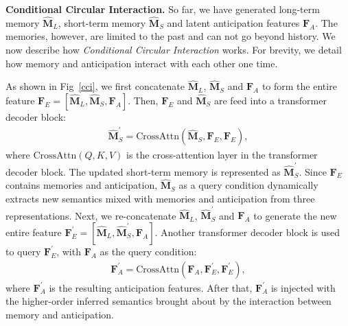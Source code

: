 \textbf{Conditional Circular Interaction.}
So far, we have generated long-term memory $\mathbf{\widehat{M}}_L$, short-term memory $\mathbf{\widehat{M}}_S$ and latent anticipation features $\mathbf{F}_A$. The memories, however, are limited to the past and can not go beyond history. 
We now describe how \emph{Conditional Circular Interaction} works.
For brevity, we detail how memory and anticipation interact with each other one time.


As shown in Fig~\ref{cci}, we first concatenate $\mathbf{\widehat{M}}_L$, $\mathbf{\widehat{M}}_S$ and $\mathbf{F}_A$ to form the entire feature $\mathbf{F}_E = [\mathbf{\widehat{M}}_L, \mathbf{\widehat{M}}_S, \mathbf{F}_A]$. 
Then, $\mathbf{F}_E$ and $\mathbf{\widehat{M}}_S$ are feed into a transformer decoder block:
\begin{equation}
    \begin{aligned}
        \mathbf{\widehat{M}}_S^{\prime} = \text{CrossAttn}(\mathbf{\widehat{M}}_S,\mathbf{F}_E,\mathbf{F}_E),
    \end{aligned}
\end{equation}
where $\text{CrossAttn}(Q,K,V)$ is the cross-attention layer in the transformer decoder block. The updated short-term memory is represented as $\mathbf{\widehat{M}}_S^{\prime}$. Since $\mathbf{F}_E$ contains memories and anticipation, $\mathbf{\widehat{M}}_S$ as a query condition dynamically extracts new semantics mixed with memories and anticipation from three representations.  Next, we re-concatenate $\mathbf{\widehat{M}}_L$, $\mathbf{\widehat{M}}_S^{\prime}$ and $\mathbf{F}_A$ to generate the new entire feature $\mathbf{F}_E^{\prime} = [\mathbf{\widehat{M}}_L, \mathbf{\widehat{M}}_S^{\prime}, \mathbf{F}_A]$. Another transformer decoder block is used to query $\mathbf{F}_E^{\prime}$, with $\mathbf{F}_A$ as the query condition:
\begin{equation}
    \begin{aligned}
        \mathbf{\mathbf{F}}_A^{\prime} = \text{CrossAttn}(\mathbf{F}_A,\mathbf{F}_E^{\prime},\mathbf{F}_E^{\prime}),
    \end{aligned}
\end{equation}
where $\mathbf{F}_A^{\prime}$ is the resulting anticipation features.
After that, $\mathbf{F}_A^{\prime}$ is injected with the higher-order inferred semantics brought about by the interaction between memory and anticipation.

